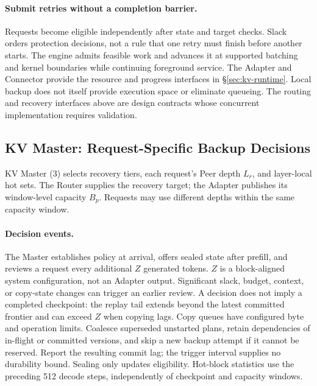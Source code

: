 \paragraph{Submit retries without a completion barrier.}
Requests become eligible independently after state and target checks.
Slack orders protection decisions, not a rule that one retry must finish
before another starts. The engine admits feasible work and advances it
at supported batching and kernel boundaries while continuing foreground
service. The Adapter and Connector provide the resource and progress
interfaces in \S\ref{sec:kv-runtime}. Local backup does not itself provide execution
space or eliminate queueing. The routing and recovery interfaces above
are design contracts whose concurrent implementation requires validation.

\subsection{KV Master: Request-Specific Backup Decisions}
\label{sec:kv-placement}
\label{sec:kv-master}

KV Master (3) selects recovery tiers, each request's Peer depth $L_r$,
and layer-local hot sets. The Router supplies the recovery target;
the Adapter publishes its window-level capacity $B_p$. Requests may use
different depths within the same capacity window.

\paragraph{Decision events.}
The Master establishes policy at arrival, offers sealed state after prefill,
and reviews a request every additional $Z$ generated tokens. $Z$ is a
block-aligned system configuration, not an Adapter output. Significant
slack, budget, context, or copy-state changes can trigger an earlier review.
A decision does not imply a completed checkpoint: the replay tail extends
beyond the latest committed frontier and can exceed $Z$ when copying lags.
Copy queues have configured byte and operation limits. Coalesce superseded
unstarted plans, retain dependencies of in-flight or committed versions,
and skip a new backup attempt if it cannot be reserved. Report the resulting
commit lag; the trigger interval supplies no durability bound.
Sealing only updates eligibility. Hot-block statistics use the preceding
512 decode steps, independently of checkpoint and capacity windows.

